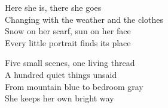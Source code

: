 \begin{lyrics}
Here she is, there she goes\\
Changing with the weather and the clothes\\
Snow on her scarf, sun on her face\\
Every little portrait finds its place

Five small scenes, one living thread\\
A hundred quiet things unsaid\\
From mountain blue to bedroom gray\\
She keeps her own bright way
\end{lyrics}

